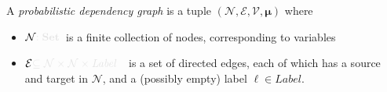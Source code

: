 \documentclass{article}
\newcommand{\notation}[2][]{#1}
\renewcommand{\notation}[2][]{{\color{notationcolor} #2}}
\newcommand\Set{\textbf{Set}}
\newcommand{\bmu}{\boldsymbol{\mu}}
\newcommand{\V}{\mathcal V}
\newcommand{\N}{\mathcal N}
\newcommand{\Ed}{\mathcal E}
\newcommand{\modelname}{probabilistic dependency graph}
\newcommand{\MN}{PDG}
\numberwithin{equation}{section}
\begin{document}
	\def\mnvars[#1]{(\N#1, \Ed#1, \V#1, \bmu#1)}
	\begin{defn}[\MN]\label{def:model}
		A \emph{\modelname} is a tuple $\mnvars[]$ where
		\begin{itemize}[nosep]
			\item $\N\notation{:\Set}$~is a finite collection of nodes, corresponding to variables
			
			\item $\Ed \notation{\subseteq \N \times \N \times \mathit{Label}}$~~is a set of directed edges, each of which has a source and target in $\N$, and a (possibly empty) label\notation{$\ell \in \mathit{Label}$}.

\end{itemize}
\end{defn}
\end{document}
